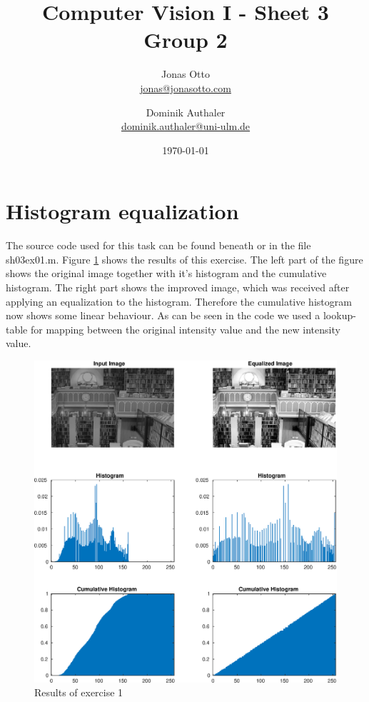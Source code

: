 \documentclass{article}
\title{Computer Vision I - Sheet 3\\Group 2\\}
\author{ Jonas Otto\\ \href{mailto:jonas@jonasotto.com}{jonas@jonasotto.com} \and Dominik Authaler \\ 
\href{mailto:dominik.authaler@uni-ulm.de}{dominik.authaler@uni-ulm.de}
}
\date{\today}
\begin{document}
\maketitle

\newpage

\section{Histogram equalization}
The source code used for this task can be found beneath or in the file sh03ex01.m. Figure \ref{ex01} shows the results of this exercise. The left part of the figure shows the original image together with it's histogram and the cumulative histogram. The right part shows the improved image, which was received after applying an equalization to the histogram. Therefore the cumulative histogram now shows some linear behaviour. As can be seen in the code we used a lookup-table for mapping between the original intensity value and the new intensity value.

\hspace{20mm}


\begin{figure}[H]
  \begin{center}
    \includegraphics[width=\textwidth]{./images/ex01.eps}
    \caption{Results of exercise 1}
    \label{ex01}
  \end{center}
\end{figure}
\end{document}

